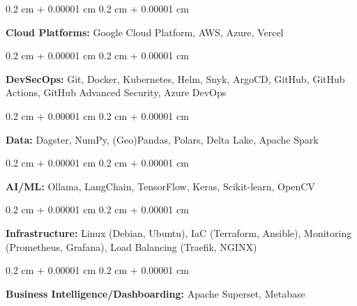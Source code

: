 \documentclass[10pt, a4paper]{article}
\newenvironment{onecolentry}{
    \begin{adjustwidth}{
        0.2 cm + 0.00001 cm
    }{
        0.2 cm + 0.00001 cm
    }
}{
    \end{adjustwidth}
} %
\begin{document}
        \begin{onecolentry}
            \textbf{Cloud Platforms:} Google Cloud Platform, AWS, Azure, Vercel
        \end{onecolentry}

        \vspace{0.2 cm}

        \begin{onecolentry}
            \textbf{DevSecOps:} Git, Docker, Kubernetes, Helm, Snyk, ArgoCD, GitHub, GitHub Actions, GitHub Advanced Security, Azure DevOps

        \end{onecolentry}

        \vspace{0.2 cm}

        \begin{onecolentry}
            \textbf{Data:} Dagster, NumPy, (Geo)Pandas, Polars, Delta Lake, Apache Spark
        \end{onecolentry}

        \vspace{0.2 cm}

        \begin{onecolentry}
            \textbf{AI/ML:} Ollama, LangChain, TensorFlow, Keras, Scikit-learn, OpenCV
        \end{onecolentry}

        \vspace{0.2 cm}

        \begin{onecolentry}
            \textbf{Infrastructure:} Linux (Debian, Ubuntu), IaC (Terraform, Ansible), Monitoring (Prometheus, Grafana),  Load Balancing (Traefik, NGINX)

        \end{onecolentry}

        \vspace{0.2 cm}

        \begin{onecolentry}
            \textbf{Business Intelligence/Dashboarding:} Apache Superset, Metabase
        \end{onecolentry}


    
\end{document}
